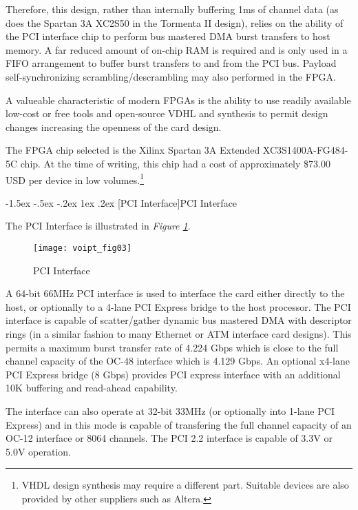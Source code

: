 \documentclass[letterpaper,final,notitlepage,twocolumn,10pt,twoside]{article}
\makeatletter
\let\normalsize = \small
\let\small = \footnotesize
\let\footnotesize = \scriptsize
\let\scriptsize = \tiny
\renewcommand\subsection{\@startsection{subsection}{2}{\z@}%
                                     {-1.5ex \@plus -.5ex \@minus -.2ex}%
                                     {1ex \@plus .2ex}%
                                     {\normalfont\normalsize\bfseries}}
\makeatother
\begin{document}
Therefore, this design, rather than internally buffering 1ms of channel data (as
does the Spartan 3A XC2S50 in the Tormenta II design), relies on the ability of
the PCI interface chip to perform bus mastered DMA burst transfers to host
memory.  A far reduced amount of on-chip RAM is required and is only used in a
FIFO arrangement to buffer burst transfers to and from the PCI bus.  Payload
self-synchronizing scrambling/descrambling may also performed in the FPGA.

A valueable characteristic of modern FPGAs is the ability to use readily
available low-cost or free tools and open-source VDHL and synthesis to permit
design changes increasing the openness of the card design.

The FPGA chip selected is the Xilinx Spartan 3A Extended XC3S1400A-FG484-5C
chip.  At the time of writing, this chip had a cost of approximately \$73.00 USD
per device in low volumes.\footnote{VHDL design synthesis may require a
different part.  Suitable devices are also provided by other suppliers such as
Altera.}

\subsection[PCI Interface]{PCI Interface}

The PCI Interface is illustrated in \textsl{Figure \ref{figure:voipt_fig03}}.
\begin{figure}[htp]
\center\texttt{[image: voipt\_fig03]}
\caption[PCI Interface]{PCI Interface}
\label{figure:voipt_fig03}
\end{figure}
A 64-bit 66MHz PCI interface is used to interface the card either directly to
the host, or optionally to a 4-lane PCI Express bridge to the host processor.
The PCI interface is capable of scatter/gather dynamic bus mastered DMA with
descriptor rings (in a similar fashion to many Ethernet or ATM interface card
designs).  This permits a maximum burst transfer rate of 4.224 Gbps which is
close to the full channel capacity of the OC-48 interface which is 4.129 Gbps.
An optional x4-lane PCI Express bridge (8 Gbps) provides PCI express interface
with an additional 10K buffering and read-ahead capability.

The interface can also operate at 32-bit 33MHz (or optionally into 1-lane PCI
Express) and in this mode is capable of transfering the full channel capacity of
an OC-12 interface or 8064 channels.  The PCI 2.2 interface is capable of 3.3V
or 5.0V operation.
\end{document}

